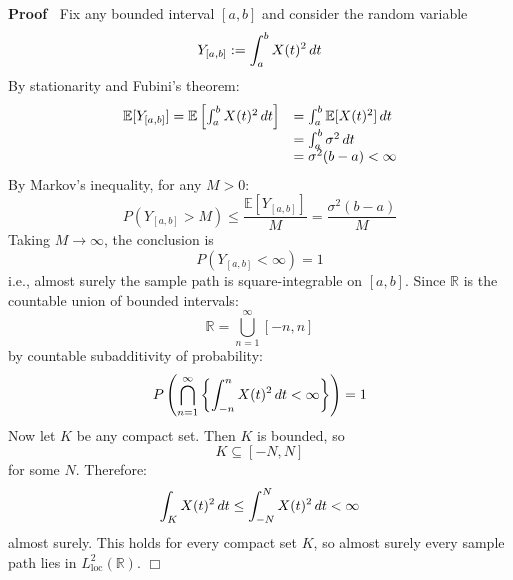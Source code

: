 \documentclass{article}
\newcommand{\assign}{:=}
\newcommand{\tmop}[1]{\ensuremath{\operatorname{#1}}}
\newenvironment{proof}{\noindent\textbf{Proof\ }}{\hspace*{\fill}$\Box$\medskip}
\begin{document}
\begin{proof}
  Fix any bounded interval $[a, b]$ and consider the random variable
  \begin{equation}
    Y_{[a, b]} \assign \int_a^b X (t)^2  \hspace{0.17em} dt
  \end{equation}
  By stationarity and Fubini's theorem:
  \begin{equation}
    \begin{array}{ll}
      \mathbb{E} [Y_{[a, b]}] =\mathbb{E} \left[ \int_a^b X (t)^2 
      \hspace{0.17em} dt \right] & = \int_a^b \mathbb{E} [X (t)^2] 
      \hspace{0.17em} dt\\
      & = \int_a^b \sigma^2  \hspace{0.17em} dt\\
      & = \sigma^2  (b - a) < \infty
    \end{array}
  \end{equation}
  By Markov's inequality, for any $M > 0$:
  \begin{equation}
    P (Y_{[a, b]} > M) \leq \frac{\mathbb{E} [Y_{[a, b]}]}{M} = \frac{\sigma^2
    (b - a)}{M}
  \end{equation}
  Taking $M \to \infty$, the conclusion is
  \begin{equation}
    P (Y_{[a, b]} < \infty) = 1
  \end{equation}
  i.e., almost surely the sample path is square-integrable on $[a, b]$. Since
  $\mathbb{R}$ is the countable union of bounded intervals:
  \begin{equation}
    \mathbb{R}= \bigcup_{n = 1}^{\infty} [- n, n]
  \end{equation}
  by countable subadditivity of probability:
  \begin{equation}
    P \left( \bigcap_{n = 1}^{\infty} \left\{ \int_{- n}^n X (t)^2 
    \hspace{0.17em} dt < \infty \right\} \right) = 1
  \end{equation}
  Now let $K$ be any compact set. Then $K$ is bounded, so
  \begin{equation}
    K \subseteq [- N, N]
  \end{equation}
  for some $N$. Therefore:
  \begin{equation}
    \int_K X (t)^2  \hspace{0.17em} dt \leq \int_{- N}^N X (t)^2 
    \hspace{0.17em} dt < \infty
  \end{equation}
  almost surely. This holds for every compact set $K$, so almost surely every
  sample path lies in $L^2_{\tmop{loc}} (\mathbb{R})$.
\end{proof}
\end{document}
